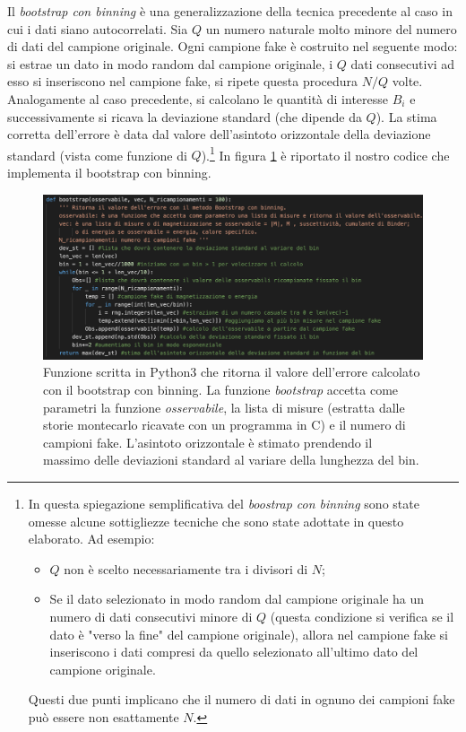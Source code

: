 \documentclass[10pt,a4paper]{article}
\begin{document}
Il \emph{bootstrap con binning} è una generalizzazione della tecnica precedente al caso in cui i dati siano autocorrelati. Sia $Q$ un numero naturale molto minore del numero di dati del campione originale. Ogni campione fake è costruito nel seguente modo: si estrae un dato in modo random dal campione originale, i $Q$ dati consecutivi ad esso si inseriscono nel campione fake, si ripete questa procedura $N/Q$ volte. Analogamente al caso precedente, si calcolano le quantità di interesse $B_i$ e successivamente si ricava la deviazione standard (che dipende da $Q$). La stima corretta dell'errore è data dal valore dell'asintoto orizzontale della deviazione standard (vista come funzione di $Q$).\footnote{In questa spiegazione semplificativa del \emph{boostrap con binning} sono state omesse alcune sottigliezze tecniche che sono state adottate in questo elaborato. Ad esempio: \begin{itemize}
\item $Q$ non è scelto necessariamente tra i divisori di $N$;
\item Se il dato selezionato in modo random dal campione originale ha un numero di dati consecutivi minore di $Q$ (questa condizione si verifica se il dato è "verso la fine" del campione originale), allora nel campione fake si inseriscono i dati compresi da quello selezionato all'ultimo dato del campione originale.
\end{itemize}
Questi due punti implicano che il numero di dati in ognuno dei campioni fake può essere non esattamente $N$.} In figura \ref{func_boot} è riportato il nostro codice che implementa il bootstrap con binning.
	\begin{figure}[h!]%
	\centering
	\includegraphics[width=1\linewidth]{func_boot}
	\caption{Funzione scritta in Python3 che ritorna il valore dell'errore calcolato con il bootstrap con binning. La funzione \emph{bootstrap} accetta come parametri la funzione \emph{osservabile}, la lista di misure (estratta dalle storie montecarlo ricavate con un programma in C) e il numero di campioni fake. L'asintoto orizzontale è stimato prendendo il massimo delle deviazioni standard al variare della lunghezza del bin.}
	\label{func_boot}
\end{figure}
\end{document}
